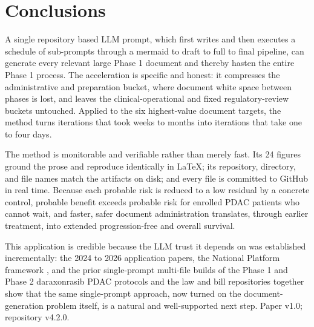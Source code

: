 \section{Conclusions}

A single repository based LLM prompt, which first writes and then executes a schedule
of sub-prompts through a mermaid to draft to full to final pipeline, can generate
every relevant large Phase 1 document and thereby hasten the entire Phase 1 process.
The acceleration is specific and honest: it compresses the administrative and
preparation bucket, where document white space between phases is lost, and leaves the
clinical-operational and fixed regulatory-review buckets untouched. Applied to the
six highest-value document targets, the method turns iterations that took weeks to
months into iterations that take one to four days.

The method is monitorable and verifiable rather than merely fast. Its 24 figures
ground the prose and reproduce identically in LaTeX; its repository, directory, and
file names match the artifacts on disk; and every file is committed to GitHub in real
time. Because each probable risk is reduced to a low residual by a concrete control,
probable benefit exceeds probable risk for enrolled PDAC patients who cannot wait,
and faster, safer document administration translates, through earlier treatment, into
extended progression-free and overall survival.

This application is credible because the LLM trust it depends on was established
incrementally: the 2024 to 2026 application papers, the National Platform framework
\cite{natplatform}, and the prior single-prompt multi-file builds of the Phase 1 and
Phase 2 daraxonrasib PDAC protocols and the law and bill repositories
\cite{phase1protocol, phase2protocol, kawchak_2026_20196639, lawnarrative,
adoptionguide, lawenactment, hr9510v5, bill01v4} together show that the same
single-prompt approach, now turned on the document-generation problem itself, is a
natural and well-supported next step. Paper v1.0; repository v4.2.0.
